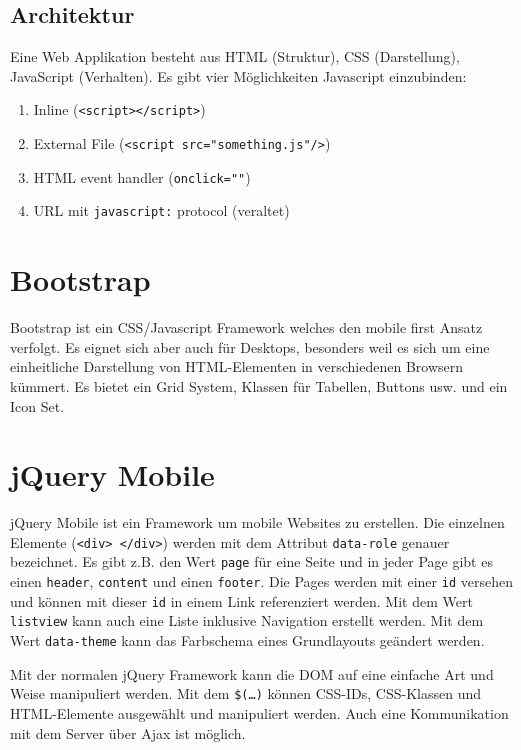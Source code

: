 \subsection{Architektur}

Eine Web Applikation besteht aus HTML (Struktur), CSS (Darstellung), JavaScript (Verhalten). Es gibt vier Möglichkeiten Javascript einzubinden:
\begin{enumerate}
	\item Inline (\texttt{<script></script>})
	\item External File (\texttt{<script src="something.js"/>})
	\item HTML event handler (\texttt{onclick=""})
	\item URL mit \texttt{javascript:} protocol (veraltet)
\end{enumerate}

\section{Bootstrap}

Bootstrap ist ein CSS/Javascript Framework welches den mobile first Ansatz verfolgt. Es eignet sich aber auch für Desktops, besonders weil es sich um eine einheitliche Darstellung von HTML-Elementen in verschiedenen Browsern kümmert. Es bietet ein Grid System, Klassen für Tabellen, Buttons usw. und ein Icon Set.

\section{jQuery Mobile}

jQuery Mobile ist ein Framework um mobile Websites zu erstellen. Die einzelnen Elemente (\texttt{<div> \allowbreak </div>}) werden mit dem Attribut \texttt{data-role} genauer bezeichnet. Es gibt z.B. den Wert \texttt{page} für eine Seite und in jeder Page gibt es einen \texttt{header}, \texttt{content} und einen \texttt{footer}. Die Pages werden mit einer \texttt{id} versehen und können mit dieser \texttt{id} in einem Link referenziert werden. Mit dem Wert \texttt{listview} kann auch eine Liste inklusive Navigation erstellt werden. Mit dem Wert \texttt{data-theme} kann das Farbschema eines Grundlayouts geändert werden.

Mit der normalen jQuery Framework kann die DOM auf eine einfache Art und Weise manipuliert werden. Mit dem \texttt{\$(\dots)} können CSS-IDs, CSS-Klassen und HTML-Elemente ausgewählt und manipuliert werden. Auch eine Kommunikation mit dem Server über Ajax ist möglich. 

